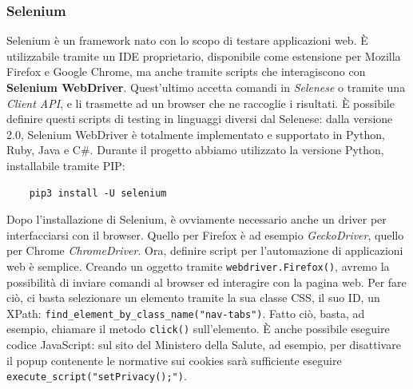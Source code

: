 \subsubsection{Selenium}
Selenium è un framework nato con lo scopo di testare applicazioni web. È utilizzabile tramite un IDE proprietario, disponibile come estensione per Mozilla Firefox e Google Chrome, ma anche tramite scripts che interagiscono con \textbf{Selenium WebDriver}. Quest'ultimo accetta comandi in \textit{Selenese} o tramite una \textit{Client API}, e li trasmette ad un browser che ne raccoglie i risultati. È possibile definire questi scripts di testing in linguaggi diversi dal Selenese: dalla versione 2.0, Selenium WebDriver è totalmente implementato e supportato in Python, Ruby, Java e C\#. Durante il progetto abbiamo utilizzato la versione Python, installabile tramite PIP:
\begin{verbatim}
    pip3 install -U selenium
\end{verbatim}
Dopo l'installazione di Selenium, è ovviamente necessario anche un driver per interfacciarsi con il browser. Quello per Firefox è ad esempio \textit{GeckoDriver}, quello per Chrome \textit{ChromeDriver}. Ora, definire script per l'automazione di applicazioni web è semplice. Creando un oggetto tramite \texttt{webdriver.Firefox()}, avremo la possibilità di inviare comandi al browser ed interagire con la pagina web. Per fare ciò, ci basta selezionare un elemento tramite la sua classe CSS, il suo ID, un XPath: \texttt{find\_element\_by\_class\_name("nav-tabs")}. Fatto ciò, basta, ad esempio, chiamare il metodo \texttt{click()} sull'elemento. È anche possibile eseguire codice JavaScript: sul sito del Ministero della Salute, ad esempio, per disattivare il popup contenente le normative sui cookies sarà sufficiente eseguire \texttt{execute\_script("setPrivacy();")}.
